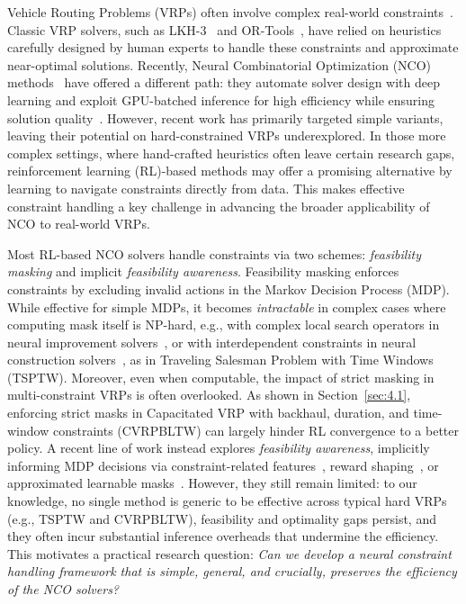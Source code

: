 \documentclass{article} %
\begin{document}
Vehicle Routing Problems (VRPs) often involve complex real-world constraints~\citep{wu2023lade}. Classic VRP solvers, such as LKH-3~\citep{lkh3} and OR-Tools~\citep{ortools_routing}, have relied on heuristics carefully designed by human experts to handle these constraints and approximate near-optimal solutions. Recently, Neural Combinatorial Optimization (NCO) methods~\citep{bengio2021machine} have offered a different path: they automate solver design with deep learning and exploit GPU-batched inference for high efficiency while ensuring solution quality~\citep{kwon2020pomo}. However, recent work has primarily targeted simple variants, leaving their potential on hard-constrained VRPs underexplored.
In those more complex settings, 
where hand-crafted heuristics often leave certain research gaps, 
reinforcement learning (RL)-based methods may offer a promising alternative by learning to navigate constraints directly from data. {This makes effective constraint handling a key challenge in advancing the broader applicability of NCO to real-world VRPs.}

Most RL-based NCO solvers handle constraints via two schemes: \emph{feasibility masking} and implicit \emph{feasibility awareness}. Feasibility masking enforces constraints by excluding invalid actions in the Markov Decision Process (MDP). While effective for simple MDPs, it becomes \emph{intractable} in complex cases where computing mask itself is NP-hard, e.g., with complex local search operators in neural improvement solvers~\citep{ma2023learning}, or with interdependent constraints in neural construction solvers~\citep{bi2024learning}, as in Traveling Salesman Problem with Time Windows (TSPTW).
Moreover, even when computable, the impact of strict masking in multi-constraint VRPs is often overlooked. {As shown in Section~\ref{sec:4.1}, enforcing strict masks in Capacitated VRP with backhaul, duration, and time-window constraints (CVRPBLTW) can largely hinder RL convergence to a better policy}. 
A recent line of work instead explores \emph{feasibility awareness}, implicitly informing MDP decisions via constraint-related features~\citep{chen2024looking}, reward shaping~\citep{ma2023learning}, or approximated learnable masks~\citep{bi2024learning}. However, they still remain limited: to our knowledge, no single method is generic to be effective across typical hard VRPs (e.g., TSPTW and CVRPBLTW), feasibility and optimality gaps persist, and they often incur substantial inference overheads that undermine the efficiency. This motivates a practical research question: \textit{Can we develop a neural constraint handling framework
that is simple, general, and crucially, preserves the efficiency of the NCO solvers?} 
\end{document}
